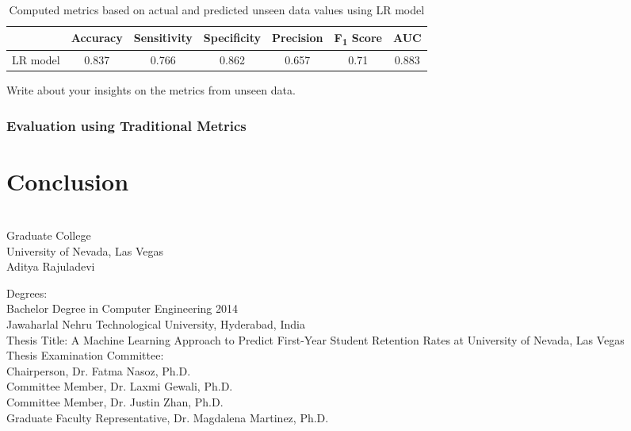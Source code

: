 \documentclass[11pt,openright]{report}
\begin{document}
\begin{table}[!htbp]
	\renewcommand{\arraystretch}{1.3}
	\caption{Computed metrics based on actual and predicted unseen data values using LR model}
	\label{table:lr-unseen_metrics_db}
	\centering
	\begin{tabular}{|c|c|c|c|c|c|c|}
    \hline
  	 & \bfseries Accuracy & \bfseries Sensitivity & \bfseries Specificity & \bfseries Precision & \bfseries F\textsubscript{1} Score  & \bfseries AUC\\  
    \hline
	LR model & 0.837 & 0.766 & 0.862 & 0.657 & 0.71 & 0.883 \\ \hline
	\end{tabular} 
\end{table}
Write about your insights on the metrics from unseen data.

\subsection {Evaluation using Traditional Metrics}
\chapter{Conclusion} \label{chapter:conclusion}



\vita
\chapter{} %
\linespread{1.3} 
\begin{center}
Graduate College\\
University of Nevada, Las Vegas\\[1cm]
Aditya Rajuladevi\\[1cm]
\end{center}

\noindent Degrees:\\
\indent Bachelor Degree in Computer Engineering 2014\\
\indent Jawaharlal Nehru Technological University, Hyderabad, India\\

\noindent Thesis Title: A Machine Learning Approach to Predict First-Year Student Retention Rates at University of Nevada, Las Vegas\\

\noindent Thesis Examination Committee:\\
\indent Chairperson, Dr. Fatma Nasoz, Ph.D.\\
\indent Committee Member, Dr. Laxmi Gewali, Ph.D.\\
\indent Committee Member, Dr. Justin Zhan, Ph.D.\\
\indent Graduate Faculty Representative, Dr. Magdalena Martinez, Ph.D.\\
\end{document}
